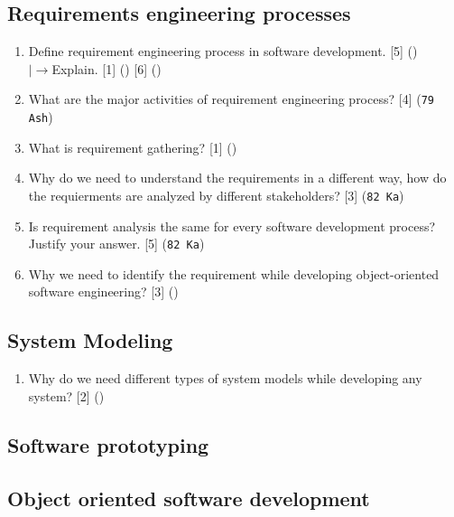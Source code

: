 \documentclass[12pt]{article}
\newcommand{\lb}{\\$\left|\rightarrow\right.$}
\begin{document}
  \subsection{Requirements engineering processes}
    \begin{enumerate}
      \item Define requirement engineering process in software development. \hfill [5] ()
        \lb Explain. \hfill [1]  () [6] ()

      \item What are the major activities of requirement engineering process? \hfill [4] (\texttt{79 Ash})

      \item What is requirement gathering? \hfill [1] ()

      \item Why do we need to understand the requirements in a different way, how do the requierments are analyzed by different stakeholders? \hfill [3] (\texttt{82 Ka})

      \item Is requirement analysis the same for every software development process? Justify your answer. \hfill [5] (\texttt{82 Ka})

      \item Why we need to identify the requirement while developing object-oriented software engineering? \hfill [3] ()
    \end{enumerate}  

  \subsection{System Modeling}
    \begin{enumerate}
      \item Why do we need different types of system models while developing any system? \hfill [2] ()
    \end{enumerate}

  \subsection{Software prototyping}
  \subsection{Object oriented software development}

\pagebreak
\end{document}
